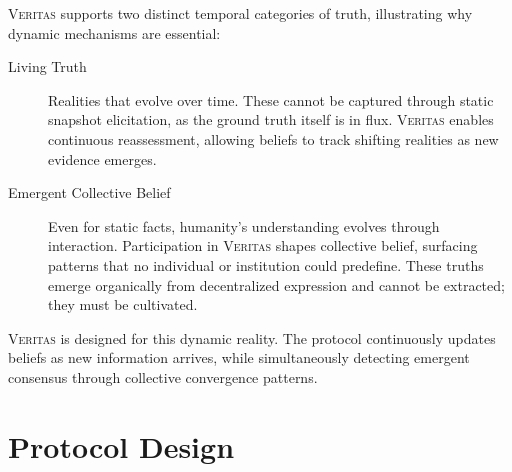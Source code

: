\documentclass[11pt,a4paper]{article}
\newcommand{\veritas}{\textsc{Veritas}}
\begin{document}
\veritas{} supports two distinct temporal categories of truth, illustrating why dynamic mechanisms are essential:

\begin{description}
\item[Living Truth] Realities that evolve over time. These cannot be captured through static snapshot elicitation, as the ground truth itself is in flux. \veritas{} enables continuous reassessment, allowing beliefs to track shifting realities as new evidence emerges.

\item[Emergent Collective Belief] Even for static facts, humanity's understanding evolves through interaction. Participation in \veritas{} shapes collective belief, surfacing patterns that no individual or institution could predefine. These truths emerge organically from decentralized expression and cannot be extracted; they must be cultivated.
\end{description}

\veritas{} is designed for this dynamic reality. The protocol continuously updates beliefs as new information arrives, while simultaneously detecting emergent consensus through collective convergence patterns.


\section{Protocol Design}
\label{sec:protocol}
\end{document}
